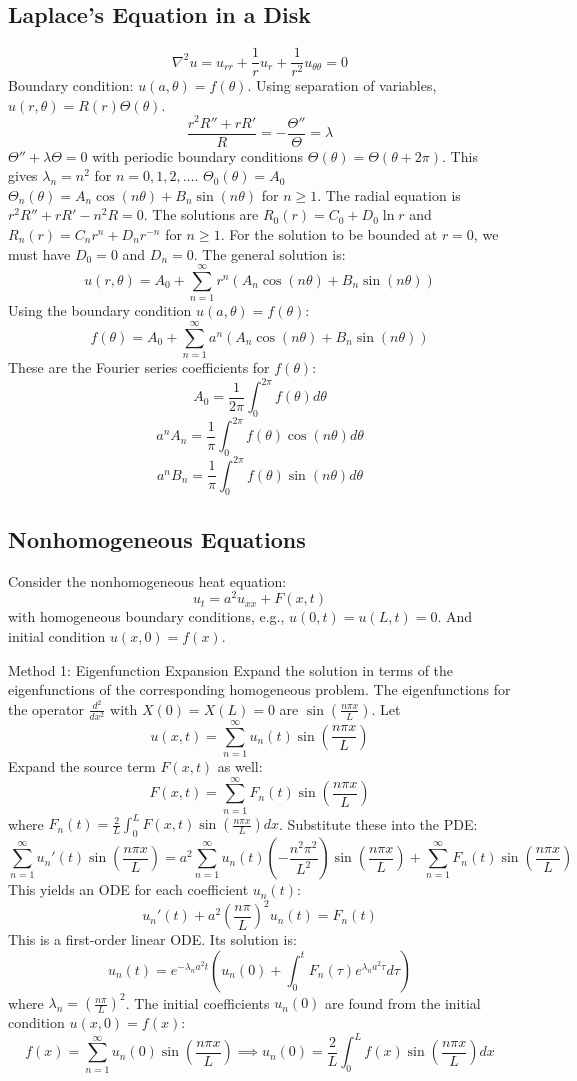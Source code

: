\documentclass{article}
\begin{document}
	\subsection*{Laplace's Equation in a Disk}
	$$ \nabla^2 u = u_{rr} + \frac{1}{r} u_r + \frac{1}{r^2} u_{\theta\theta} = 0 $$
	Boundary condition: $u(a, \theta) = f(\theta)$.
	Using separation of variables, $u(r, \theta) = R(r) \Theta(\theta)$.
	$$ \frac{r^2 R'' + r R'}{R} = -\frac{\Theta''}{\Theta} = \lambda $$
	$\Theta'' + \lambda \Theta = 0$ with periodic boundary conditions $\Theta(\theta) = \Theta(\theta+2\pi)$.
	This gives $\lambda_n = n^2$ for $n=0, 1, 2, \dots$.
	$\Theta_0(\theta) = A_0$
	$\Theta_n(\theta) = A_n \cos(n\theta) + B_n \sin(n\theta)$ for $n \ge 1$.
	The radial equation is $r^2 R'' + rR' - n^2 R = 0$.
	The solutions are $R_0(r) = C_0 + D_0 \ln r$ and $R_n(r) = C_n r^n + D_n r^{-n}$ for $n \ge 1$.
	For the solution to be bounded at $r=0$, we must have $D_0=0$ and $D_n=0$.
	The general solution is:
	$$ u(r,\theta) = A_0 + \sum_{n=1}^{\infty} r^n (A_n \cos(n\theta) + B_n \sin(n\theta)) $$
	Using the boundary condition $u(a, \theta) = f(\theta)$:
	$$ f(\theta) = A_0 + \sum_{n=1}^{\infty} a^n (A_n \cos(n\theta) + B_n \sin(n\theta)) $$
	These are the Fourier series coefficients for $f(\theta)$:
	$$ A_0 = \frac{1}{2\pi} \int_0^{2\pi} f(\theta) d\theta $$
	$$ a^n A_n = \frac{1}{\pi} \int_0^{2\pi} f(\theta) \cos(n\theta) d\theta $$
	$$ a^n B_n = \frac{1}{\pi} \int_0^{2\pi} f(\theta) \sin(n\theta) d\theta $$
	
	\subsection*{Nonhomogeneous Equations}
	Consider the nonhomogeneous heat equation:
	$$ u_t = a^2 u_{xx} + F(x,t) $$
	with homogeneous boundary conditions, e.g., $u(0,t)=u(L,t)=0$.
	And initial condition $u(x,0) = f(x)$.
	
	Method 1: Eigenfunction Expansion
	Expand the solution in terms of the eigenfunctions of the corresponding homogeneous problem.
	The eigenfunctions for the operator $\frac{d^2}{dx^2}$ with $X(0)=X(L)=0$ are $\sin(\frac{n\pi x}{L})$.
	Let
	$$ u(x,t) = \sum_{n=1}^{\infty} u_n(t) \sin(\frac{n\pi x}{L}) $$
	Expand the source term $F(x,t)$ as well:
	$$ F(x,t) = \sum_{n=1}^{\infty} F_n(t) \sin(\frac{n\pi x}{L}) $$
	where $F_n(t) = \frac{2}{L} \int_0^L F(x,t) \sin(\frac{n\pi x}{L}) dx$.
	Substitute these into the PDE:
	$$ \sum_{n=1}^{\infty} u_n'(t) \sin(\frac{n\pi x}{L}) = a^2 \sum_{n=1}^{\infty} u_n(t) (-\frac{n^2\pi^2}{L^2}) \sin(\frac{n\pi x}{L}) + \sum_{n=1}^{\infty} F_n(t) \sin(\frac{n\pi x}{L}) $$
	This yields an ODE for each coefficient $u_n(t)$:
	$$ u_n'(t) + a^2 (\frac{n\pi}{L})^2 u_n(t) = F_n(t) $$
	This is a first-order linear ODE. Its solution is:
	$$ u_n(t) = e^{-\lambda_n a^2 t} \left( u_n(0) + \int_0^t F_n(\tau) e^{\lambda_n a^2 \tau} d\tau \right) $$
	where $\lambda_n = (\frac{n\pi}{L})^2$.
	The initial coefficients $u_n(0)$ are found from the initial condition $u(x,0)=f(x)$:
	$$ f(x) = \sum_{n=1}^{\infty} u_n(0) \sin(\frac{n\pi x}{L}) \implies u_n(0) = \frac{2}{L} \int_0^L f(x) \sin(\frac{n\pi x}{L}) dx $$
\end{document}
